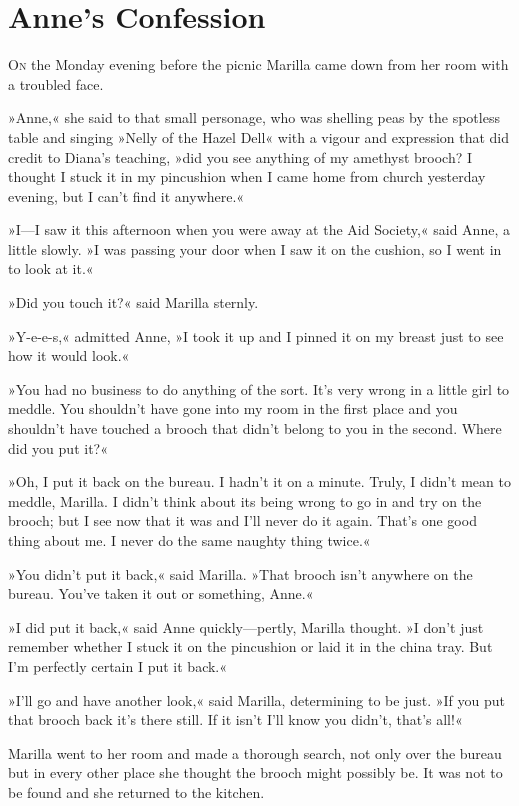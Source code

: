\chapter{Anne's Confession}

\lettrine[lines=4]{O}{n} the Monday evening before the picnic Marilla came down from her room with a troubled face.

\zz
»Anne,« she said to that small personage, who was shelling peas by the spotless table and singing »Nelly of the Hazel Dell« with a vigour and expression that did credit to Diana's teaching, »did you see anything of my amethyst brooch? I thought I stuck it in my pincushion when I came home from church yesterday evening, but I can't find it anywhere.«

»I—I saw it this afternoon when you were away at the Aid Society,« said Anne, a little slowly. »I was passing your door when I saw it on the cushion, so I went in to look at it.«

»Did you touch it?« said Marilla sternly.

»Y-e-e-s,« admitted Anne, »I took it up and I pinned it on my breast just to see how it would look.«

»You had no business to do anything of the sort. It's very wrong in a little girl to meddle. You shouldn't have gone into my room in the first place and you shouldn't have touched a brooch that didn't belong to you in the second. Where did you put it?«

»Oh, I put it back on the bureau. I hadn't it on a minute. Truly, I didn't mean to meddle, Marilla. I didn't think about its being wrong to go in and try on the brooch; but I see now that it was and I'll never do it again. That's one good thing about me. I never do the same naughty thing twice.«

»You didn't put it back,« said Marilla. »That brooch isn't anywhere on the bureau. You've taken it out or something, Anne.«

»I did put it back,« said Anne quickly—pertly, Marilla thought. »I don't just remember whether I stuck it on the pincushion or laid it in the china tray. But I'm perfectly certain I put it back.«

»I'll go and have another look,« said Marilla, determining to be just. »If you put that brooch back it's there still. If it isn't I'll know you didn't, that's all!«

Marilla went to her room and made a thorough search, not only over the bureau but in every other place she thought the brooch might possibly be. It was not to be found and she returned to the kitchen.

